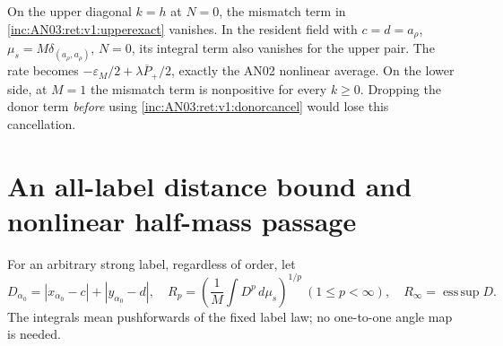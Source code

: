 \documentclass[11pt]{article}
\numberwithin{equation}{section}
\theoremstyle{remark}\newtheorem{remark}[theorem]{Remark}
\newcommand{\dd}{\,d}
\newcommand{\1}{\mathbf 1}
\begin{document}
On the upper diagonal $k=h$ at $N=0$, the mismatch term in
\eqref{inc:AN03:ret:v1:upperexact} vanishes. In the resident field with
$c=d=a_\rho$, $\mu_s=M\delta_{(a_\rho,a_\rho)}$, $N=0$, its integral
term also vanishes for the upper pair. The rate becomes
$-\varepsilon_M/2+\lambda\overline P_+/2$, exactly the AN02 nonlinear
average. On the lower side, at $M=1$ the mismatch term is nonpositive
for every $k\ge0$. Dropping the donor term \emph{before} using
\eqref{inc:AN03:ret:v1:donorcancel} would lose this cancellation.

\section{An all-label distance bound and nonlinear half-mass passage}
\label{inc:AN03:ret:v1:passage}
For an arbitrary strong label, regardless of order, let
\[
 D_{\alpha_0}=|x_{\alpha_0}-c|+|y_{\alpha_0}-d|,
 \quad
 R_p=\left(\frac1M\int D^p\dd\mu_s\right)^{1/p}\ (1\le p<\infty),
 \quad R_\infty=\operatorname*{ess\,sup}D.
\]
The integrals mean pushforwards of the fixed label law; no one-to-one
angle map is needed.
\end{document}
